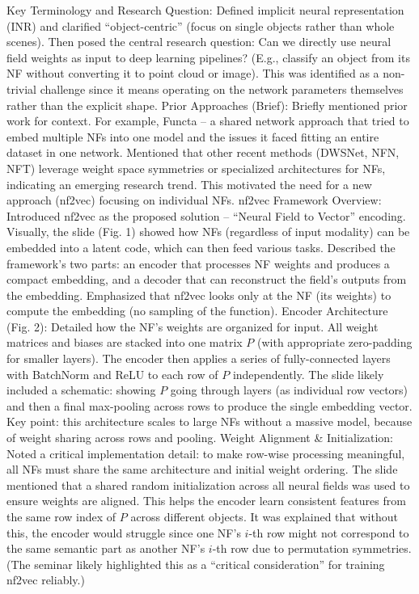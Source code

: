 \documentclass[11pt]{article}
\begin{document}
Key Terminology and Research Question: Defined implicit neural representation (INR) and clarified “object-centric” (focus on single objects rather than whole scenes). Then posed the central research question: Can we directly use neural field weights as input to deep learning pipelines? (E.g., classify an object from its NF without converting it to point cloud or image). This was identified as a non-trivial challenge since it means operating on the network parameters themselves rather than the explicit shape.
Prior Approaches (Brief): Briefly mentioned prior work for context. For example, Functa – a shared network approach that tried to embed multiple NFs into one model and the issues it faced fitting an entire dataset in one network. Mentioned that other recent methods (DWSNet, NFN, NFT) leverage weight space symmetries or specialized architectures for NFs, indicating an emerging research trend. This motivated the need for a new approach (nf2vec) focusing on individual NFs.
nf2vec Framework Overview: Introduced nf2vec as the proposed solution – “Neural Field to Vector” encoding. Visually, the slide (Fig. 1) showed how NFs (regardless of input modality) can be embedded into a latent code, which can then feed various tasks. Described the framework’s two parts: an encoder that processes NF weights and produces a compact embedding, and a decoder that can reconstruct the field’s outputs from the embedding. Emphasized that nf2vec looks only at the NF (its weights) to compute the embedding (no sampling of the function).
Encoder Architecture (Fig. 2): Detailed how the NF’s weights are organized for input. All weight matrices and biases are stacked into one matrix $P$ (with appropriate zero-padding for smaller layers). The encoder then applies a series of fully-connected layers with BatchNorm and ReLU to each row of $P$ independently. The slide likely included a schematic: showing $P$ going through layers (as individual row vectors) and then a final max-pooling across rows to produce the single embedding vector. Key point: this architecture scales to large NFs without a massive model, because of weight sharing across rows and pooling.
Weight Alignment & Initialization: Noted a critical implementation detail: to make row-wise processing meaningful, all NFs must share the same architecture and initial weight ordering. The slide mentioned that a shared random initialization across all neural fields was used to ensure weights are aligned. This helps the encoder learn consistent features from the same row index of $P$ across different objects. It was explained that without this, the encoder would struggle since one NF’s $i$-th row might not correspond to the same semantic part as another NF’s $i$-th row due to permutation symmetries. (The seminar likely highlighted this as a “critical consideration” for training nf2vec reliably.)
\end{document}

